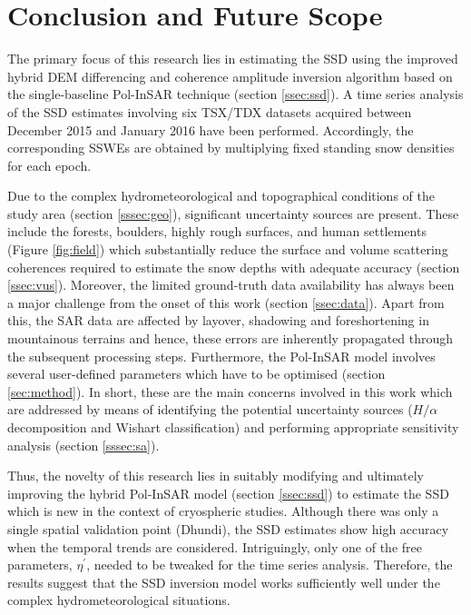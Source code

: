 \documentclass[12pt]{elsarticle}
\numberwithin{equation}{section}
\numberwithin{figure}{section}
\numberwithin{table}{section}
\begin{document}
\section{Conclusion and Future Scope}
\label{sec:conc}

The primary focus of this research lies in estimating the SSD using the improved hybrid DEM differencing and coherence amplitude inversion algorithm based on the single-baseline Pol-InSAR technique (section \ref{ssec:ssd}). A time series analysis of the SSD estimates involving six TSX/TDX datasets acquired between December 2015 and January 2016 have been performed. Accordingly, the corresponding SSWEs are obtained by multiplying fixed standing snow densities for each epoch.

Due to the complex hydrometeorological and topographical conditions of the study area (section \ref{sssec:geo}), significant uncertainty sources are present. These include the forests, boulders, highly rough surfaces, and human settlements (Figure \ref{fig:field}) which substantially reduce the surface and volume scattering coherences required to estimate the snow depths with adequate accuracy (section \ref{ssec:vus}). Moreover, the limited ground-truth data availability has always been a major challenge from the onset of this work (section \ref{ssec:data}). Apart from this, the SAR data are affected by layover, shadowing and foreshortening in mountainous terrains and hence, these errors are inherently propagated through the subsequent processing steps. Furthermore, the Pol-InSAR model involves several user-defined parameters which have to be optimised (section \ref{sec:method}). In short, these are the main concerns involved in this work which are addressed by means of identifying the potential uncertainty sources ($H/{\alpha}$ decomposition and Wishart classification) and performing appropriate sensitivity analysis (section \ref{sssec:sa}).

Thus, the novelty of this research lies in suitably modifying and ultimately improving the hybrid Pol-InSAR model (section \ref{ssec:ssd}) to estimate the SSD which is new in the context of cryospheric studies. Although there was only a single spatial validation point (Dhundi), the SSD estimates show high accuracy when the temporal trends are considered. Intriguingly, only one of the free parameters, $\eta^\prime$, needed to be tweaked for the time series analysis. Therefore, the results suggest that the SSD inversion model works sufficiently well under the complex hydrometeorological situations.
\end{document}
